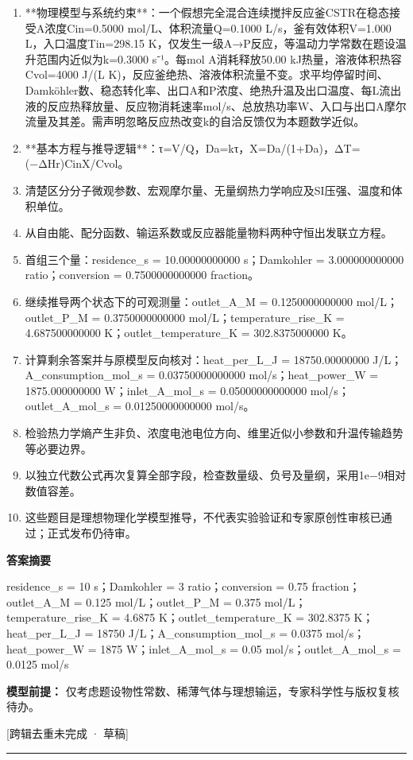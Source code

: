 \documentclass[UTF8,11pt,a4paper]{ctexart}
\begin{document}
\begin{enumerate}
\item **物理模型与系统约束**：一个假想完全混合连续搅拌反应釜CSTR在稳态接受A浓度Cin=0.5000 mol/L、体积流量Q=0.1000 L/s，釜有效体积V=1.000 L，入口温度Tin=298.15 K，仅发生一级A→P反应，等温动力学常数在题设温升范围内近似为k=0.3000 s⁻¹。每mol A消耗释放50.00 kJ热量，溶液体积热容Cvol=4000 J/(L K)，反应釜绝热、溶液体积流量不变。求平均停留时间、Damköhler数、稳态转化率、出口A和P浓度、绝热升温及出口温度、每L流出液的反应热释放量、反应物消耗速率mol/s、总放热功率W、入口与出口A摩尔流量及其差。需声明忽略反应热改变k的自洽反馈仅为本题数学近似。
\item **基本方程与推导逻辑**：τ=V/Q，Da=kτ，X=Da/(1+Da)，ΔT=(−ΔHr)CinX/Cvol。
\item 清楚区分分子微观参数、宏观摩尔量、无量纲热力学响应及SI压强、温度和体积单位。
\item 从自由能、配分函数、输运系数或反应器能量物料两种守恒出发联立方程。
\item 首组三个量：residence\_s = 10.00000000000 s；Damkohler = 3.000000000000 ratio；conversion = 0.7500000000000 fraction。
\item 继续推导两个状态下的可观测量：outlet\_A\_M = 0.1250000000000 mol/L；outlet\_P\_M = 0.3750000000000 mol/L；temperature\_rise\_K = 4.687500000000 K；outlet\_temperature\_K = 302.8375000000 K。
\item 计算剩余答案并与原模型反向核对：heat\_per\_L\_J = 18750.00000000 J/L；A\_consumption\_mol\_s = 0.03750000000000 mol/s；heat\_power\_W = 1875.000000000 W；inlet\_A\_mol\_s = 0.05000000000000 mol/s；outlet\_A\_mol\_s = 0.01250000000000 mol/s。
\item 检验热力学熵产生非负、浓度电池电位方向、维里近似小参数和升温传输趋势等必要边界。
\item 以独立代数公式再次复算全部字段，检查数量级、负号及量纲，采用1e−9相对数值容差。
\item 这些题目是理想物理化学模型推导，不代表实验验证和专家原创性审核已通过；正式发布仍待审。
\end{enumerate}
\noindent\textbf{答案摘要}\par
residence\_s = 10 s；Damkohler = 3 ratio；conversion = 0.75 fraction；outlet\_A\_M = 0.125 mol/L；outlet\_P\_M = 0.375 mol/L；temperature\_rise\_K = 4.6875 K；outlet\_temperature\_K = 302.8375 K；heat\_per\_L\_J = 18750 J/L；A\_consumption\_mol\_s = 0.0375 mol/s；heat\_power\_W = 1875 W；inlet\_A\_mol\_s = 0.05 mol/s；outlet\_A\_mol\_s = 0.0125 mol/s\par
\noindent\textbf{模型前提：}
仅考虑题设物性常数、稀薄气体与理想输运，专家科学性与版权复核待办。\par
\noindent\textcolor{red!65!black}{[跨辑去重未完成 · 草稿]} \par
\medskip\hrule\medskip
{}
\end{document}
